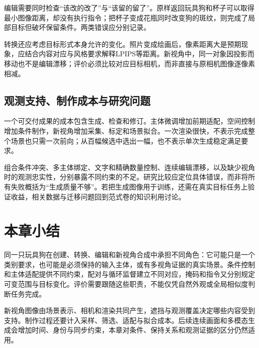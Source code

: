 编辑需要同时检查“该改的改了”与“该留的留了”。原样返回玩具狗和杯子可以取得最小图像距离，却没有执行指令；把杯子变成花瓶同时改变狗的斑纹，则完成了局部目标但破坏保留条件。两类错误应分别记录。

转换还应考虑目标形式本身允许的变化。照片变成绘画后，像素距离大是预期现象，应结合内容对应与风格要求解释LPIPS等距离。新视角中，同一对象因投影而移动也不是编辑漂移；评价必须比较对应目标相机，而非直接与原相机图像逐像素相减。

\subsection{观测支持、制作成本与研究问题}
\label{sec:vision-generation-costs}

一个可交付成果的成本包含生成、检查和修订。主体微调增加前期适配，空间控制增加条件制作，新视角增加采集、标定和场景拟合。一次渲染很快，不表示完成整个场景也只需一次前向；从百幅候选中选出一幅，也不表示单次生成稳定满足要求。

组合条件冲突、多主体绑定、文字和精确数量控制、连续编辑漂移，以及缺少视角时的观测忠实性，分别暴露不同约束的不足。研究比较应定位具体错误，而非将所有失败概括为“生成质量不够”。若把生成图像用于训练，还需在真实目标任务上验证收益，相关数据与迁移问题回到范式卷的知识利用讨论。

\section{本章小结}
\label{sec:vision-generation-summary}

同一只玩具狗在创建、转换、编辑和新视角合成中承担不同角色：它可能只是一个类别要求，也可能是必须保持的输入主体，或有多视角证据的真实场景。条件控制和主体适配提供不同约束，配对与循环监督建立不同对应，掩码和指令又分别规定可变范围与目标变化。评价需要跟随这些职责，不能仅凭自然外观或全局相似度判断任务完成。

新视角图像由场景表示、相机和渲染共同产生，遮挡与观测覆盖决定哪些内容受到支持。制作过程还要计入采样、筛选、适配与拟合成本。后续连续画面和多模态生成会增加时间、身份与同步约束，本章对条件、保持关系和观测证据的区分仍然适用。
